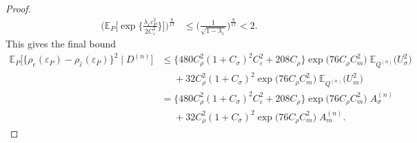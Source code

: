 \documentclass[aos]{imsart}
\newcommand{\E}{\mathbb{E}}
\begin{document}
\begin{proof}
\begin{align*}
			\bigg(\E_P\bigg[ \exp\bigg\{\frac{\lambda_\varepsilon \varepsilon_P^2}{2C_\varepsilon^2}\bigg\}\bigg]\bigg)^{\frac8{17}} & \leq \bigg(\frac{1}{\sqrt{1-\lambda_\varepsilon}}\bigg)^{\frac8{17}} <2.
		\end{align*}
		This gives the final bound 
		\begin{align*}
			\E_P\Big[\big\{\rho_{e}(\varepsilon_P)-\rho_{\hat\varepsilon}(\varepsilon_P)\big\}^2 \; \Big| \; D^{(n)}\Big] &\leq 
			\big\{480C_\rho^2(1+C_\sigma)^2C_\varepsilon^2 + 208 C_\rho\big\} \exp\big(76 C_\rho C_m^2\big) \;\E_{Q^{(n)}}\big(U_\sigma^2\big)\\
			&\phantom{\leq} + 32C_\rho^2(1+C_\sigma)^2 \exp\big(76 C_\rho C_m^2\big) \;\E_{Q^{(n)}} \big(U_m^2\big)\\
			&=
			\big\{480C_\rho^2(1+C_\sigma)^2C_\varepsilon^2 + 208C_\rho\big\} \exp\big(76 C_\rho C_m^2\big) \;A_\sigma^{(n)}\\
			&\phantom{\leq} + 32C_\rho^2(1+C_\sigma)^2 \exp\big(76 C_\rho C_m^2\big) \;A_m^{(n)}.
		\end{align*}
		
	\end{proof}
\end{document}
